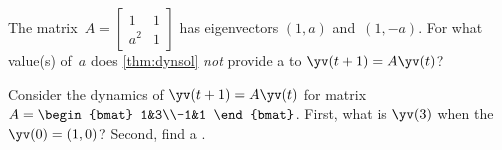 \begin{activity}
The matrix~\(A=\begin{bmatrix} 1&1\\a^2&1 \end{bmatrix}\) has eigenvectors \((1,a)\) and~\((1,-a)\).
For what value(s) of~\(a\) does \cref{thm:dynsol} \emph{not} provide a  to \(\yv(t+1)=A\yv(t)\)?
\end{activity}


\begin{example} \label{eg:2x2ccgrow}
Consider the dynamics of \(\yv(t+1)=A\yv(t)\) for matrix \(A=\begin{bmat} 1&3\\-1&1 \end{bmat}\).
First, what is \(\yv(3)\) when the  \(\yv(0)=(1,0)\)?
Second, find a .


\end{example}
